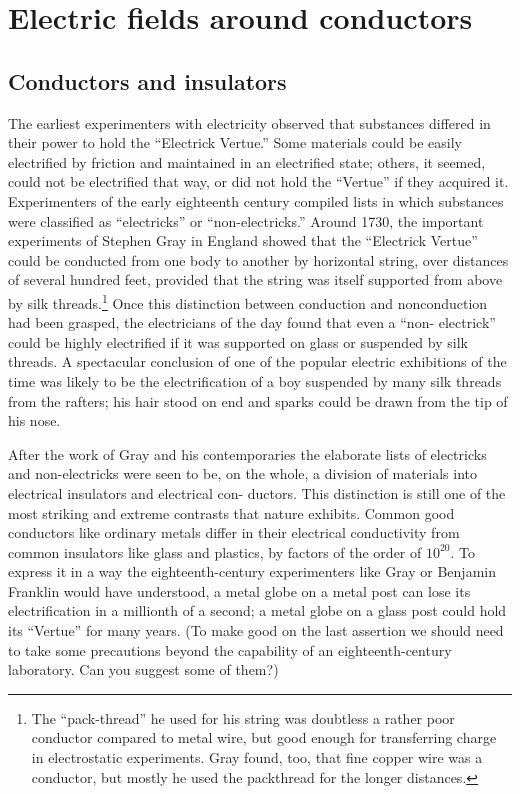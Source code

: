 \chapter{Electric fields around conductors}

\section{Conductors and insulators}

The earliest experimenters with electricity observed that substances
differed in their power to hold the ``Electrick Vertue.'' Some
materials could be easily electrified by friction and maintained in an
electrified state; others, it seemed, could not be electrified that way,
or did not hold the ``Vertue'' if they acquired it. Experimenters of
the early eighteenth century compiled lists in which substances were
classified as ``electricks'' or ``non-electricks.'' Around 1730, the important
experiments of Stephen Gray in England showed that the
``Electrick Vertue'' could be conducted from one body to another by
horizontal string, over distances of several hundred feet, provided
that the string was itself supported from above by silk 
threads.\footnote{The ``pack-thread'' he used for his string was doubtless a rather poor conductor
compared to metal wire, but good enough for transferring charge in electrostatic 
experiments. Gray found, too, that fine copper wire was a conductor, but mostly he
used the packthread for the longer distances.}
Once this distinction between conduction and nonconduction had
been grasped, the electricians of the day found that even a ``non-
electrick'' could be highly electrified if it was supported on glass or
suspended by silk threads. A spectacular conclusion of one of the
popular electric exhibitions of the time was likely to be the electrification
of a boy suspended by many silk threads from the rafters; his
hair stood on end and sparks could be drawn from the tip of his nose.

After the work of Gray and his contemporaries the elaborate lists
of electricks and non-electricks were seen to be, on the whole, a
division of materials into electrical insulators and electrical con-
ductors. This distinction is still one of the most striking and extreme
contrasts that nature exhibits. Common good conductors like
ordinary metals differ in their electrical conductivity from common
insulators like glass and plastics, by factors of the order of $10^20$. To
express it in a way the eighteenth-century experimenters like Gray
or Benjamin Franklin would have understood, a metal globe on a
metal post can lose its electrification in a millionth of a second; a
metal globe on a glass post could hold its ``Vertue'' for many years.
(To make good on the last assertion we should need to take some 
precautions beyond the capability of an eighteenth-century laboratory.
Can you suggest some of them?)



